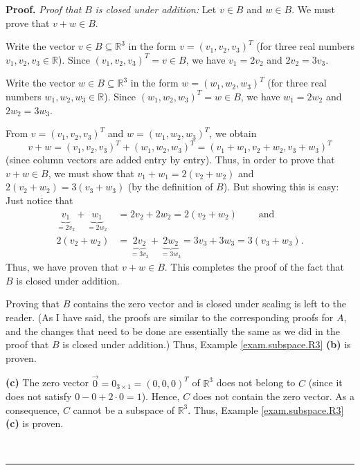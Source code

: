 \documentclass[numbers=enddot,12pt,final,onecolumn,notitlepage]{scrartcl}%
\theoremstyle{definition}
\newenvironment{proof}[1][Proof]{\noindent\textbf{#1.} }{\ \rule{0.5em}{0.5em}}
\begin{document}
\begin{proof}
\textit{Proof that }$B$ \textit{is closed under addition:} Let $v\in B$ and
$w\in B$. We must prove that $v+w\in B$.

Write the vector $v\in B\subseteq\mathbb{R}^{3}$ in the form $v=\left(
v_{1},v_{2},v_{3}\right)  ^{T}$ (for three real numbers $v_{1},v_{2},v_{3}%
\in\mathbb{R}$). Since $\left(  v_{1},v_{2},v_{3}\right)  ^{T}=v\in B$, we
have $v_{1}=2v_{2}$ and $2v_{2}=3v_{3}$.

Write the vector $w\in B\subseteq\mathbb{R}^{3}$ in the form $w=\left(
w_{1},w_{2},w_{3}\right)  ^{T}$ (for three real numbers $w_{1},w_{2},w_{3}%
\in\mathbb{R}$). Since $\left(  w_{1},w_{2},w_{3}\right)  ^{T}=w\in B$, we
have $w_{1}=2w_{2}$ and $2w_{2}=3w_{3}$.

From $v=\left(  v_{1},v_{2},v_{3}\right)  ^{T}$ and $w=\left(  w_{1}%
,w_{2},w_{3}\right)  ^{T}$, we obtain%
\[
v+w=\left(  v_{1},v_{2},v_{3}\right)  ^{T}+\left(  w_{1},w_{2},w_{3}\right)
^{T}=\left(  v_{1}+w_{1},v_{2}+w_{2},v_{3}+w_{3}\right)  ^{T}%
\]
(since column vectors are added entry by entry). Thus, in order to prove that
$v+w\in B$, we must show that $v_{1}+w_{1}=2\left(  v_{2}+w_{2}\right)  $ and
$2\left(  v_{2}+w_{2}\right)  =3\left(  v_{3}+w_{3}\right)  $ (by the
definition of $B$). But showing this is easy: Just notice that%
\begin{align*}
\underbrace{v_{1}}_{=2v_{2}}+\underbrace{w_{1}}_{=2w_{2}}  &  =2v_{2}%
+2w_{2}=2\left(  v_{2}+w_{2}\right)  \ \ \ \ \ \ \ \ \ \ \text{and}\\
2\left(  v_{2}+w_{2}\right)   &  =\underbrace{2v_{2}}_{=3v_{3}}%
+\underbrace{2w_{2}}_{=3w_{3}}=3v_{3}+3w_{3}=3\left(  v_{3}+w_{3}\right)  .
\end{align*}
Thus, we have proven that $v+w\in B$. This completes the proof of the fact
that $B$ is closed under addition.

Proving that $B$ contains the zero vector and is closed under scaling is left
to the reader. (As I have said, the proofs are similar to the corresponding
proofs for $A$, and the changes that need to be done are essentially the same
as we did in the proof that $B$ is closed under addition.) Thus, Example
\ref{exam.subspace.R3} \textbf{(b)} is proven.

\textbf{(c)} The zero vector $\overrightarrow{0}=0_{3\times1}=\left(
0,0,0\right)  ^{T}$ of $\mathbb{R}^{3}$ does not belong to $C$ (since it does
not satisfy $0-0+2\cdot0=1$). Hence, $C$ does not contain the zero vector. As
a consequence, $C$ cannot be a subspace of $\mathbb{R}^{3}$. Thus, Example
\ref{exam.subspace.R3} \textbf{(c)} is proven.


\end{proof}
\end{document}
